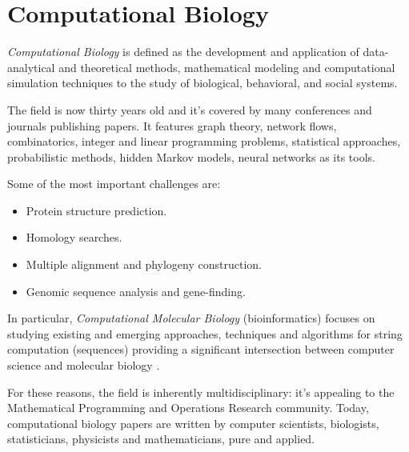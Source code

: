 \section{Computational Biology} 
 
\textit{Computational Biology} is defined as the development and application of data-analytical and theoretical methods, mathematical modeling and computational simulation techniques to the study of biological, behavioral, and social systems\cite{1}.

The field is now thirty years old and it's covered by many conferences and journals publishing papers. It features graph theory, network flows, combinatorics, integer and linear programming problems, statistical approaches, probabilistic methods, hidden Markov models, neural networks as its tools.

Some of the most important challenges are\cite{Searls19983}:
\begin{itemize}
\item Protein structure prediction.
\item Homology searches.
\item Multiple alignment and phylogeny construction.
\item Genomic sequence analysis and gene-finding.
\end{itemize}

In particular, \textit{Computational Molecular Biology} (bioinformatics) focuses on studying existing and emerging approaches, techniques and algorithms for string computation (sequences) providing a significant intersection between computer science and molecular biology \cite{Gusfield:1997:AST:262228}.

For these reasons, the field is inherently multidisciplinary: it's appealing to the Mathematical Programming and Operations Research community. 
Today, computational biology papers are written by computer scientists, biologists, statisticians, physicists and mathematicians, pure and applied.
\clearpage
